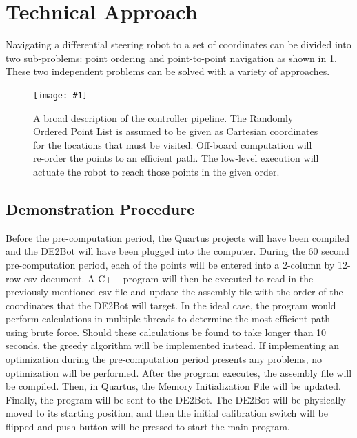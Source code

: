 \documentclass[11pt,conference,onecolumn]{article} %
\newcommand{\myfigure}[4]{
  \begin{figure}[h!]
      \centering
      \texttt{[image: \#1]}
      \caption{#2}
\label{#4}
    \end{figure}
}
\begin{document}
\section*{Technical Approach}

Navigating a differential steering robot to a set of coordinates can be divided into two sub-problems: point ordering and point-to-point navigation as shown in \cref{fig:pipeline}. These two independent problems can be solved with a variety of approaches.

\myfigure{images/Pipeline.jpg}{A broad description of the controller pipeline. The Randomly Ordered Point List is assumed to be given as Cartesian coordinates for the locations that must be visited. Off-board computation will re-order the points to an efficient path. The low-level execution will actuate the robot to reach those points in the given order.}{0.5}{fig:pipeline}
\subsection*{Demonstration Procedure}
Before the pre-computation period, the Quartus projects will have been compiled and the DE2Bot will have been plugged into the computer. During the 60 second pre-computation period, each of the points will be entered into a 2-column by 12-row csv document. A C++ program will then be executed to read in the previously mentioned csv file and update the assembly file with the order of the coordinates that the DE2Bot will target. In the ideal case, the program would perform calculations in  multiple threads to determine the most efficient path using brute force. Should these calculations be found to take longer than 10 seconds, the greedy algorithm will be implemented instead. If implementing an optimization during the pre-computation period presents any problems, no optimization will be performed. After the program executes, the assembly file will be compiled. Then, in Quartus, the Memory Initialization File will be updated. Finally, the program will be sent to the DE2Bot. The DE2Bot will be physically moved to its starting position, and then the initial calibration switch will be flipped and push button will be pressed to start the main program.
\end{document}
